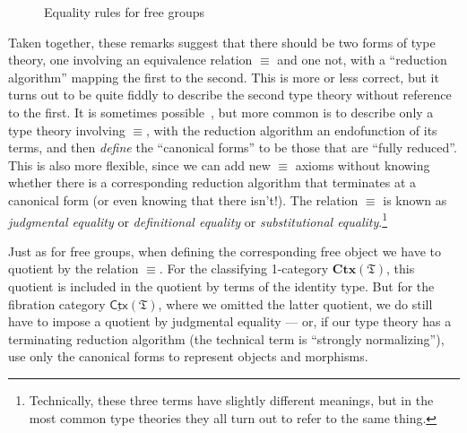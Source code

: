 \documentclass[10pt]{article}
\let\jdeq\equiv
\def\elt{\;\mathsf{elt}}
\def\equiv{\mathsf{Equiv}}
\def\fT{\mathfrak{T}}
\def\CtxT{\mathbf{Ctx}(\fT)}
\def\sCtx{\underline{\mathsf{Ctx}}}
\def\sCtxT{\sCtx(\fT)}
\numberwithin{equation}{section}
\begin{document}
\begin{subappendices}
\begin{figure}
  \centering
{}
\caption{Equality rules for free groups}
\label{fig:fg-taut-jdeq}
\end{figure}

Taken together, these remarks suggest that there should be two forms of type theory, one involving an equivalence relation $\jdeq$ and one not, with a ``reduction algorithm'' mapping the first to the second. %
This is more or less correct, but it turns out to be quite fiddly to describe the second type theory without reference to the first.
It is sometimes possible~\cite{hl:lf}, but more common is to describe only a type theory involving $\jdeq$, with the reduction algorithm an endofunction of its terms, and then \emph{define} the ``canonical forms'' to be those that are ``fully reduced''.
This is also more flexible, since we can add new $\jdeq$ axioms without knowing whether there is a corresponding reduction algorithm that terminates at a canonical form (or even knowing that there isn't!).
The relation $\jdeq$ is known as \emph{judgmental equality} or \emph{definitional equality} or \emph{substitutional equality}.\footnote{Technically, these three terms have slightly different meanings, but in the most common type theories they all turn out to refer to the same thing.}

Just as for free groups, when defining the corresponding free object we have to quotient by the relation $\jdeq$.
For the classifying 1-category $\CtxT$, this quotient is included in the quotient by terms of the identity type.
But for the fibration category $\sCtxT$, where we omitted the latter quotient, we do still have to impose a quotient by judgmental equality --- or, if our type theory has a terminating reduction algorithm (the technical term is ``strongly normalizing''), use only the canonical forms to represent objects and morphisms.


\end{subappendices}
\end{document}
